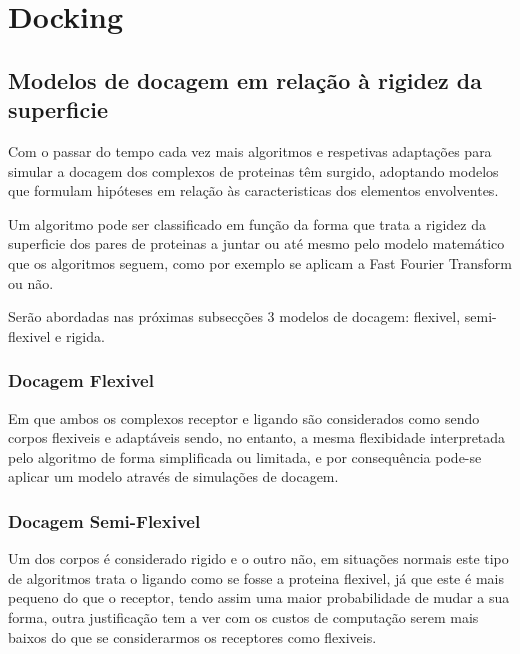 \section{Docking}
\subsection{Modelos de docagem em relação à rigidez da superficie}
\label{classi}
Com o passar do tempo cada vez mais algoritmos e respetivas adaptações para simular a docagem dos complexos de proteinas têm surgido, adoptando modelos que formulam hipóteses em relação às caracteristicas dos elementos envolventes. 

Um algoritmo pode ser classificado em função da forma que trata a rigidez  da superficie dos pares de proteinas a juntar ou até mesmo pelo modelo matemático que os algoritmos seguem, como por exemplo se aplicam a Fast Fourier Transform ou não.

Serão abordadas nas próximas subsecções 3 modelos de docagem: flexivel, semi-flexivel e rigida. 



	\subsubsection{Docagem Flexivel} Em que ambos os complexos receptor e ligando são considerados como sendo corpos flexiveis e adaptáveis sendo, no entanto, a mesma flexibidade interpretada pelo algoritmo de forma simplificada ou limitada, e por consequência pode-se aplicar um modelo através de simulações de docagem.

	\subsubsection{Docagem Semi-Flexivel} Um dos corpos é considerado rigido e o outro não, em situações normais este tipo de algoritmos trata o ligando como se fosse a proteina flexivel, já que este é mais pequeno do que o receptor, tendo assim uma maior probabilidade de mudar a sua forma, outra justificação tem a ver com os custos de computação serem mais baixos do que se considerarmos os receptores como flexiveis.

